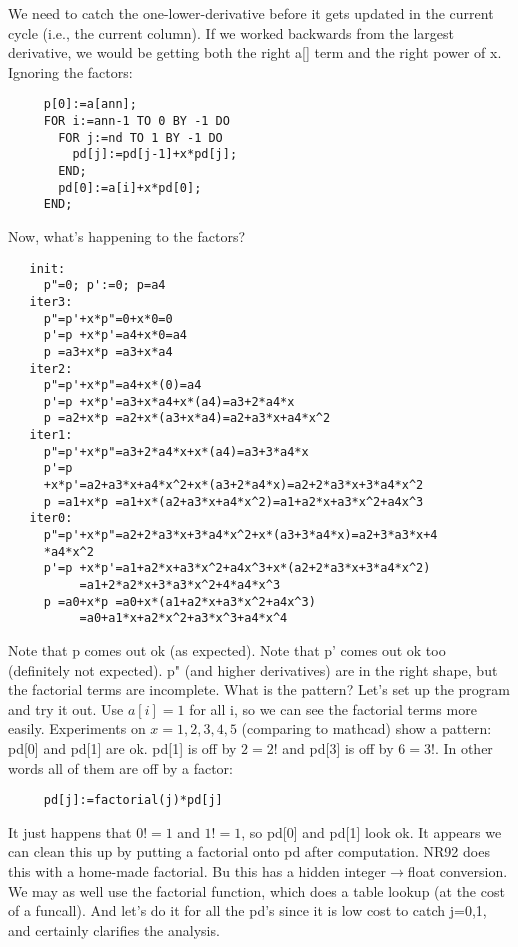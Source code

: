We need to catch the one-lower-derivative before it gets
updated in the current cycle (i.e., the current column).  If
we worked backwards from the largest derivative, we would be
getting both the right a[] term and the right power of x.
Ignoring the factors:
\begin{verbatim}
     p[0]:=a[ann];
     FOR i:=ann-1 TO 0 BY -1 DO
       FOR j:=nd TO 1 BY -1 DO
         pd[j]:=pd[j-1]+x*pd[j];
       END;
       pd[0]:=a[i]+x*pd[0];
     END;
\end{verbatim}

Now, what's happening to the factors?
\begin{verbatim}
   init:
     p"=0; p':=0; p=a4
   iter3:
     p"=p'+x*p"=0+x*0=0
     p'=p +x*p'=a4+x*0=a4
     p =a3+x*p =a3+x*a4
   iter2:
     p"=p'+x*p"=a4+x*(0)=a4
     p'=p +x*p'=a3+x*a4+x*(a4)=a3+2*a4*x
     p =a2+x*p =a2+x*(a3+x*a4)=a2+a3*x+a4*x^2
   iter1:
     p"=p'+x*p"=a3+2*a4*x+x*(a4)=a3+3*a4*x
     p'=p
     +x*p'=a2+a3*x+a4*x^2+x*(a3+2*a4*x)=a2+2*a3*x+3*a4*x^2
     p =a1+x*p =a1+x*(a2+a3*x+a4*x^2)=a1+a2*x+a3*x^2+a4x^3
   iter0:
     p"=p'+x*p"=a2+2*a3*x+3*a4*x^2+x*(a3+3*a4*x)=a2+3*a3*x+4
     *a4*x^2
     p'=p +x*p'=a1+a2*x+a3*x^2+a4x^3+x*(a2+2*a3*x+3*a4*x^2)
          =a1+2*a2*x+3*a3*x^2+4*a4*x^3
     p =a0+x*p =a0+x*(a1+a2*x+a3*x^2+a4x^3)
          =a0+a1*x+a2*x^2+a3*x^3+a4*x^4
\end{verbatim}

Note that p comes out ok (as expected).  Note that p' comes
out ok too (definitely not expected).  p" (and higher
derivatives) are in the right shape, but the factorial terms
are incomplete.  What is the pattern?  Let's set up the
program and try it out.  Use $a[i]=1$ for all i, so we can see
the factorial terms more easily.  Experiments on
$x=1,2,3,4,5$ (comparing to mathcad) show a pattern:  pd[0]
and pd[1] are ok.  pd[1] is off by $2=2!$ and pd[3] is off by
$6=3!$.  In other words all of them are off by a factor:
\begin{verbatim}
     pd[j]:=factorial(j)*pd[j]
\end{verbatim}

It just happens that $0!=1$ and $1!=1$, so pd[0] and pd[1] look
ok.  It appears we can clean this up by putting a factorial
onto pd after computation.  NR92 does this with a home-made
factorial.  Bu this has a hidden integer$\rightarrow$float conversion.
We may as well use the factorial function, which does a
table lookup (at the cost of a funcall).  And let's do it
for all the pd's since it is low cost to catch j=0,1, and
certainly clarifies the analysis.


